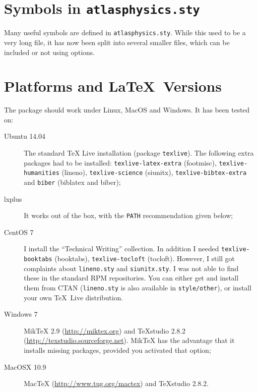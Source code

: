 \documentclass[koma,UKenglish]{style/atlasdoc}
\begin{document}
\section{Symbols in \texttt{atlasphysics.sty}}
\label{sec:atlasphysics}

Many useful symbols are defined in \texttt{atlasphysics.sty}.
While this used to be a very long file, it has now been split into several smaller files,
which can be included or not using options.


\section{Platforms and \LaTeX\ Versions}
\label{sec:version}

The package should work under Linux, MacOS and Windows. It has been tested on:
\begin{description}
\item[Ubuntu 14.04]
	The standard TeX Live installation (package \texttt{texlive}).
	The following extra packages had to be installed:
	\texttt{texlive-latex-extra} (footmisc),
	\texttt{texlive-humanities} (lineno),
	\texttt{texlive-science} (siunitx),
	\texttt{texlive-bibtex-extra} and \texttt{biber} (biblatex and biber);
\item[lxplus] It works out of the box, with the \texttt{PATH} recommendation given below;
\item[CentOS 7] I install the ``Technical Writing'' collection.
	In addition I needed \texttt{texlive-booktabs} (booktabs), \texttt{texlive-tocloft} (tocloft).
	However, I still got complaints about \texttt{lineno.sty} and \texttt{siunitx.sty}.
	I was not able to find these in the standard RPM repositories.
	You can either get and install them from CTAN (\texttt{lineno.sty} is also available in \texttt{style/other}),
	or install your own \TeX\ Live distribution.
\item[Windows 7]
	MikTeX 2.9 (\url{http://miktex.org}) and TeXstudio 2.8.2 (\url{http://texstudio.sourceforge.net}).
	MikTeX has the advantage that it installs missing packages, provided you activated that option;
\item[MacOSX 10.9]
	MacTeX (\url{http://www.tug.org/mactex}) and TeXstudio 2.8.2.
\end{description}
\end{document}
